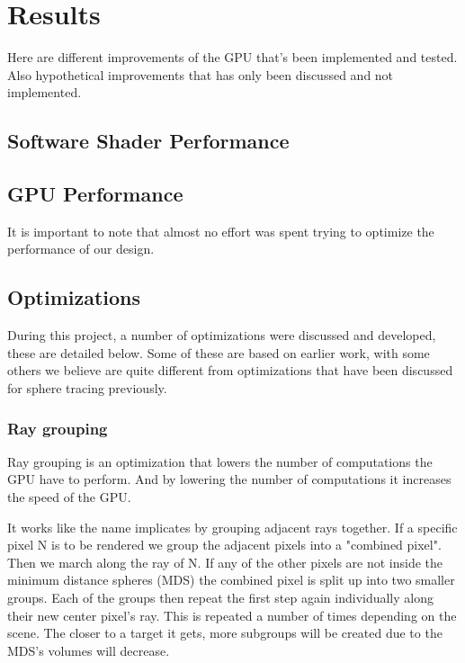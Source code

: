 \chapter{Results}

	Here are different improvements of the GPU that's been implemented and tested.
	Also hypothetical improvements that has only been discussed and not
	implemented.

	\section{Software Shader Performance}

	\section{GPU Performance}
		
		It is important to note that almost no effort was spent trying to
		optimize the performance of our design.

	\section{Optimizations}
		
		During this project, a number of optimizations were discussed and 
		developed, these are detailed below. Some of these are based on earlier
		work, with some others we believe are quite different from optimizations
		that have been discussed for sphere tracing previously.

		\subsection{Ray grouping}
		
			Ray grouping is an optimization that lowers the number of
			computations the GPU have to perform. And by lowering the number of
			computations it increases the speed of the GPU.
			
			It works like the name implicates by grouping adjacent rays
			together.  If a specific pixel N is to be rendered we group the
			adjacent pixels into a "combined pixel". Then we march along the
			ray of N. If any of the other pixels are not inside the minimum
			distance spheres (MDS) the combined pixel is split up into two
			smaller groups. Each of the groups then repeat the first step again
			individually along their new center pixel's ray. This is repeated a
			number of times depending on the scene.  The closer to a target it
			gets, more subgroups will be created due to the MDS's volumes will
			decrease.
			
